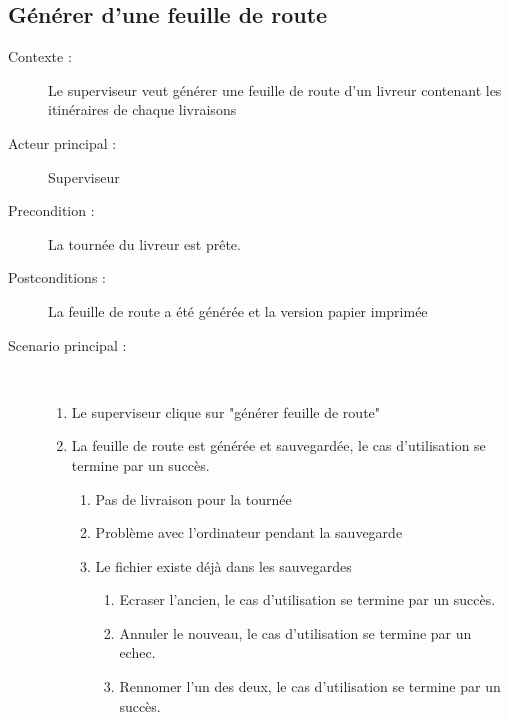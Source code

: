 \subsection{G\'en\'erer d'une feuille de route}
\begin{description}
    \item[Contexte :] Le superviseur veut g\'en\'erer une feuille de route d'un livreur contenant les itin\'eraires de chaque livraisons
    \item[Acteur principal :] Superviseur
    \item[Precondition :] La tourn\'ee du livreur est pr\^ete.
    \item[Postconditions :] La feuille de route a \'et\'e g\'en\'er\'ee et la version papier imprim\'ee
    \item[Scenario principal :] ~
    \begin{enumerate}
        \item Le superviseur clique sur "g\'en\'erer feuille de route"
        \item La feuille de route est g\'en\'er\'ee et sauvegard\'ee, le cas d'utilisation se termine par un succ\`es.
        \begin{enumerate}
            \item Pas de livraison pour la tourn\'ee
            \item Probl\`eme avec l'ordinateur pendant la sauvegarde
            \item Le fichier existe d\'ej\`a dans les sauvegardes
            \begin{enumerate}
                \item Ecraser l'ancien, le cas d'utilisation se termine par un succ\`es.
                \item Annuler le nouveau, le cas d'utilisation se termine par un echec.
                \item Rennomer l'un des deux, le cas d'utilisation se termine par un succ\`es.
            \end{enumerate}
        \end{enumerate}
    \end{enumerate}
\end{description}
\pagebreak

